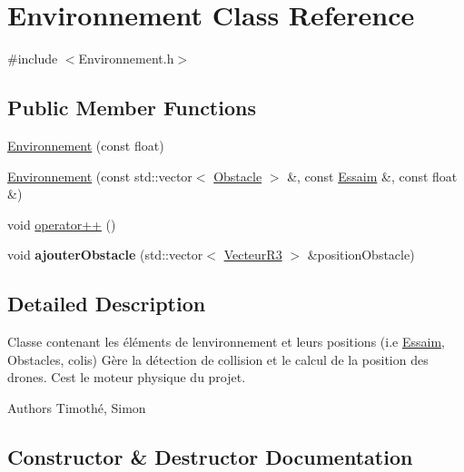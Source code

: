 \hypertarget{class_environnement}{}\section{Environnement Class Reference}
\label{class_environnement}


{\ttfamily \#include $<$Environnement.\+h$>$}

\subsection*{Public Member Functions}
\begin{DoxyCompactItemize}
\item 
\mbox{\hyperlink{class_environnement_abcab96a9b547b3a7bf6a12588edf7ad9}{Environnement}} (const float)
\item 
\mbox{\hyperlink{class_environnement_a63bc7f1c4687029018c3a1ac452fab4b}{Environnement}} (const std\+::vector$<$ \mbox{\hyperlink{class_obstacle}{Obstacle}} $>$ \&, const \mbox{\hyperlink{class_essaim}{Essaim}} \&, const float \&)
\item 
void \mbox{\hyperlink{class_environnement_a9f855742c6fb69335f0852a018d321f4}{operator++}} ()
\item 
\mbox{\label{class_environnement_acaf11f04594225ef0d76164568855633}} 
void {\bfseries ajouter\+Obstacle} (std\+::vector$<$ \mbox{\hyperlink{class_vecteur_r3}{Vecteur\+R3}} $>$ \&position\+Obstacle)
\end{DoxyCompactItemize}


\subsection{Detailed Description}
Classe contenant les éléments de l\textquotesingle{}environnement et leurs positions (i.\+e \mbox{\hyperlink{class_essaim}{Essaim}}, Obstacles, colis) Gère la détection de collision et le calcul de la position des drones. C\textquotesingle{}est le moteur physique du projet.

\begin{DoxyAuthor}{Authors}
Timothé, Simon 
\end{DoxyAuthor}


\subsection{Constructor \& Destructor Documentation}
\mbox{\label{class_environnement_abcab96a9b547b3a7bf6a12588edf7ad9}} 
